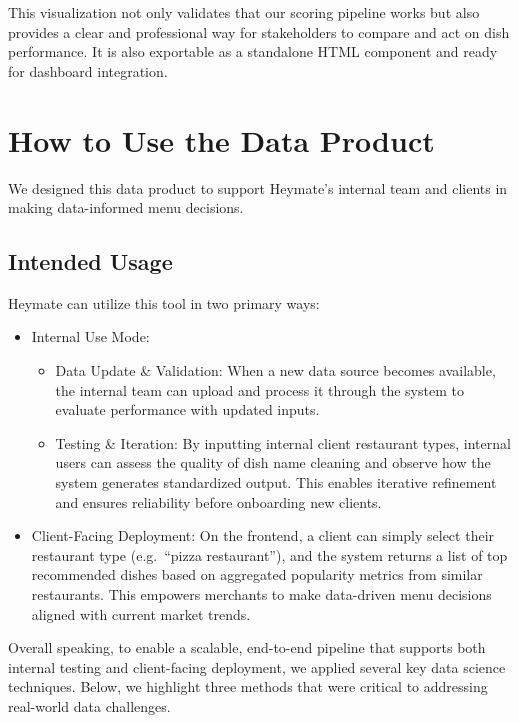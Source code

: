 \documentclass[
  11pt,
  a4paper,
  DIV=11,
  numbers=noendperiod]{scrartcl}
\providecommand{\tightlist}{%
  \setlength{\itemsep}{0pt}\setlength{\parskip}{0pt}}\usepackage{longtable,booktabs,array}
\begin{document}
This visualization not only validates that our scoring pipeline works
but also provides a clear and professional way for stakeholders to
compare and act on dish performance. It is also exportable as a
standalone HTML component and ready for dashboard integration.

\section{How to Use the Data Product}\label{how-to-use-the-data-product}

We designed this data product to support Heymate's internal team and
clients in making data-informed menu decisions.

\subsection{Intended Usage}\label{intended-usage}

Heymate can utilize this tool in two primary ways:

\begin{itemize}
\tightlist
\item
  Internal Use Mode:

  \begin{itemize}
  \tightlist
  \item
    Data Update \& Validation: When a new data source becomes available,
    the internal team can upload and process it through the system to
    evaluate performance with updated inputs.
  \item
    Testing \& Iteration: By inputting internal client restaurant types,
    internal users can assess the quality of dish name cleaning and
    observe how the system generates standardized output. This enables
    iterative refinement and ensures reliability before onboarding new
    clients.
  \end{itemize}
\item
  Client-Facing Deployment: On the frontend, a client can simply select
  their restaurant type (e.g.~``pizza restaurant''), and the system
  returns a list of top recommended dishes based on aggregated
  popularity metrics from similar restaurants. This empowers merchants
  to make data-driven menu decisions aligned with current market trends.
\end{itemize}

Overall speaking, to enable a scalable, end-to-end pipeline that
supports both internal testing and client-facing deployment, we applied
several key data science techniques. Below, we highlight three methods
that were critical to addressing real-world data challenges.
\end{document}
